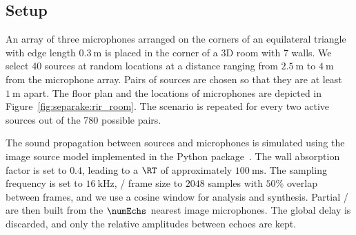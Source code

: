 \subsection{Setup}
An array of three microphones arranged on the corners of an equilateral triangle with edge length $\SI{0.3}{\m}$ is placed in the corner of a 3D room with 7 walls.
We select 40 sources at random locations at a distance ranging from $\SI{2.5}{\m}$ to $\SI{4}{\m}$ from the microphone array.
Pairs of sources are chosen so that they are at least $\SI{1}{\m}$ apart.
The floor plan and the locations of microphones are depicted in Figure~\ref{fig:separake:rir_room}.
The scenario is repeated for every two active sources out of the 780 possible pairs.

\mynewline
The sound propagation between sources and microphones is simulated using the
image source model implemented in the  Python package~.
The wall absorption factor is set to $0.4$, leading to a $\RT$ of approximately $\SI{100}{\ms}$.
The sampling frequency is set to $\SI{16}{\kHz}$, \STFT/ frame size to $2048$ samples with $50\%$ overlap between frames, and we use a cosine window for analysis and synthesis.
Partial \RTFs/ are then built from the $\numEchs$ nearest image microphones.
The global delay is discarded, and only the relative amplitudes between echoes are kept.

